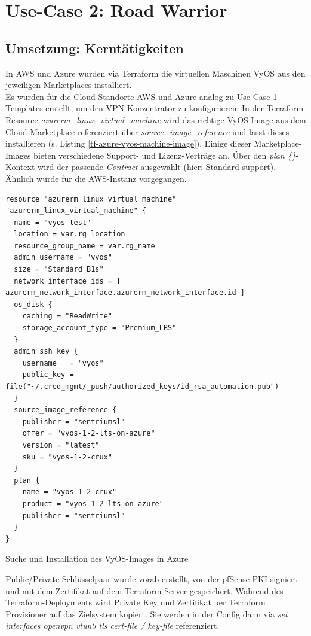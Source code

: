 \section{Use-Case 2: Road Warrior} \label{Use-Case 2: Road Warrior}
\subsection{Umsetzung: Kerntätigkeiten}

In AWS und Azure wurden via Terraform die virtuellen Maschinen VyOS aus den jeweiligen Marketplaces installiert.\\
Es wurden für die Cloud-Standorte AWS und Azure analog zu Use-Case 1 Templates erstellt, um den \gls{VPN-Konzentrator} zu konfigurieren. In der Terraform Resource \textit{azurerm\_linux\_virtual\_machine} wird das richtige VyOS-Image aus dem Cloud-Marketplace referenziert über \textit{source\_image\_reference} und lässt dieses installieren (s. Listing \ref{tf-azure-vyos-machine-image}). Einige dieser Market\-place-Images bieten verschiedene Support- und Lizenz-Verträge an. Über den \textit{plan \{\}}-Kontext wird der passende \textit{Contract} ausgewählt (hier: \glqq Standard support\grqq{}). Ähnlich wurde für die AWS-Instanz vorgegangen. 
\begin{listing}[h]
\begin{verbatim}
resource "azurerm_linux_virtual_machine"  "azurerm_linux_virtual_machine" {
  name = "vyos-test"
  location = var.rg_location
  resource_group_name = var.rg_name
  admin_username = "vyos"
  size = "Standard_B1s"
  network_interface_ids = [ azurerm_network_interface.azurerm_network_interface.id ]
  os_disk {
    caching = "ReadWrite"
    storage_account_type = "Premium_LRS"
  }
  admin_ssh_key {
    username   = "vyos"
    public_key = file("~/.cred_mgmt/_push/authorized_keys/id_rsa_automation.pub")
  }
  source_image_reference {
    publisher = "sentriumsl"
    offer = "vyos-1-2-lts-on-azure"
    version = "latest"
    sku = "vyos-1-2-crux"
  }
  plan {
    name = "vyos-1-2-crux"
    product = "vyos-1-2-lts-on-azure"
    publisher = "sentriumsl"
  }
}
\end{verbatim}
\caption{Suche und Installation des VyOS-Images in Azure}
\label{tf-azure-vyos-machine-image}
\end{listing}\FloatBarrier
Public/Private-Schlüsselpaar wurde vorab erstellt, von der pfSense-\gls{PKI} signiert und mit dem Zertifikat auf dem Terraform-Server gespeichert. Während des Terraform-\gls{Deployment}s wird Private Key und Zertifikat per Terraform Provisioner auf das Zielsystem kopiert. Sie werden in der Config dann via \textit{set interfaces openvpn vtun0 tls cert-file / key-file} referenziert.\\
